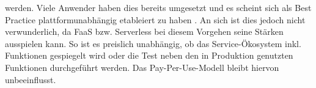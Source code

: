 werden. Viele Anwender haben dies bereits umgesetzt und es scheint sich als \glqq Best Practice\grqq{} plattformunabhängig etableiert zu haben \cite{leitner2019mixed}. An sich ist dies jedoch nicht verwunderlich, da FaaS bzw. Serverless bei diesem Vorgehen seine Stärken ausspielen kann. So ist es preislich unabhängig, ob das Service-Ökosystem inkl. Funktionen gespiegelt wird oder die Test neben den in Produktion genutzten Funktionen durchgeführt werden. Das Pay-Per-Use-Modell bleibt hiervon unbeeinflusst.    



